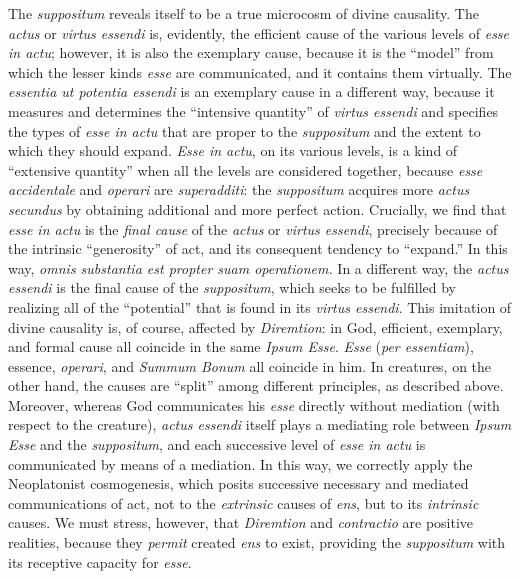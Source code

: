 The \emph{suppositum} reveals itself to be a true microcosm of divine causality. The \emph{actus} or \emph{virtus essendi} is, evidently, the efficient cause of the various levels of \emph{esse in actu}; however, it is also the exemplary cause, because it is the ``model'' from which the lesser kinds \emph{esse} are communicated, and it contains them virtually. The \emph{essentia ut potentia essendi} is an exemplary cause in a different way, because it measures and determines the ``intensive quantity'' of \emph{virtus essendi} and specifies the types of \emph{esse in actu} that are proper to the \emph{suppositum} and the extent to which they should expand. \emph{Esse in actu}, on its various levels, is a kind of ``extensive quantity'' when all the levels are considered together, because \emph{esse accidentale} and \emph{operari} are \emph{superadditi}: the \emph{suppositum} acquires more \emph{actus secundus} by obtaining additional and more perfect action. Crucially, we find that \emph{esse in actu} is the \emph{final cause} of the \emph{actus} or \emph{virtus essendi}, precisely because of the intrinsic ``generosity'' of act, and its consequent tendency to ``expand.'' In this way, \emph{omnis substantia est propter suam operationem.} In a different way, the \emph{actus essendi} is the final cause of the \emph{suppositum}, which seeks to be fulfilled by realizing all of the ``potential'' that is found in its \emph{virtus essendi}. This imitation of divine causality is, of course, affected by \emph{Diremtion}: in God, efficient, exemplary, and formal cause all coincide in the same \emph{Ipsum Esse}. \emph{Esse} (\emph{per essentiam}), essence, \emph{operari}, and \emph{Summum Bonum} all coincide in him. In creatures, on the other hand, the causes are ``split'' among different principles, as described above. Moreover, whereas God communicates his \emph{esse} directly without mediation (with respect to the creature), \emph{actus essendi} itself plays a mediating role between \emph{Ipsum Esse} and the \emph{suppositum}, and each successive level of \emph{esse in actu} is communicated by means of a mediation. In this way, we correctly apply the Neoplatonist cosmogenesis, which posits successive necessary and mediated communications of act, not to the \emph{extrinsic} causes of \emph{ens}, but to its \emph{intrinsic} causes. We must stress, however, that \emph{Diremtion} and \emph{contractio} are positive realities, because they \emph{permit} created \emph{ens} to exist, providing the \emph{suppositum} with its receptive capacity for \emph{esse}.

